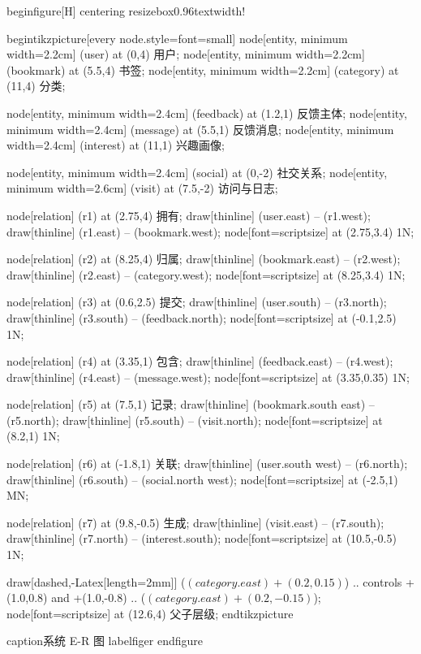 begin{figure}[H]
centering
resizebox{0.96textwidth}{!}{
begin{tikzpicture}[every node.style={font=small}]
  node[entity, minimum width=2.2cm] (user) at (0,4) {用户};
  node[entity, minimum width=2.2cm] (bookmark) at (5.5,4) {书签};
  node[entity, minimum width=2.2cm] (category) at (11,4) {分类};

  node[entity, minimum width=2.4cm] (feedback) at (1.2,1) {反馈主体};
  node[entity, minimum width=2.4cm] (message) at (5.5,1) {反馈消息};
  node[entity, minimum width=2.4cm] (interest) at (11,1) {兴趣画像};

  node[entity, minimum width=2.4cm] (social) at (0,-2) {社交关系};
  node[entity, minimum width=2.6cm] (visit) at (7.5,-2) {访问与日志};

  node[relation] (r1) at (2.75,4) {拥有};
  draw[thinline] (user.east) -- (r1.west);
  draw[thinline] (r1.east) -- (bookmark.west);
  node[font=scriptsize] at (2.75,3.4) {1N};

  node[relation] (r2) at (8.25,4) {归属};
  draw[thinline] (bookmark.east) -- (r2.west);
  draw[thinline] (r2.east) -- (category.west);
  node[font=scriptsize] at (8.25,3.4) {1N};

  node[relation] (r3) at (0.6,2.5) {提交};
  draw[thinline] (user.south) -- (r3.north);
  draw[thinline] (r3.south) -- (feedback.north);
  node[font=scriptsize] at (-0.1,2.5) {1N};

  node[relation] (r4) at (3.35,1) {包含};
  draw[thinline] (feedback.east) -- (r4.west);
  draw[thinline] (r4.east) -- (message.west);
  node[font=scriptsize] at (3.35,0.35) {1N};

  node[relation] (r5) at (7.5,1) {记录};
  draw[thinline] (bookmark.south east) -- (r5.north);
  draw[thinline] (r5.south) -- (visit.north);
  node[font=scriptsize] at (8.2,1) {1N};

  node[relation] (r6) at (-1.8,1) {关联};
  draw[thinline] (user.south west) -- (r6.north);
  draw[thinline] (r6.south) -- (social.north west);
  node[font=scriptsize] at (-2.5,1) {MN};

  node[relation] (r7) at (9.8,-0.5) {生成};
  draw[thinline] (visit.east) -- (r7.south);
  draw[thinline] (r7.north) -- (interest.south);
  node[font=scriptsize] at (10.5,-0.5) {1N};

  draw[dashed,-{Latex[length=2mm]}] ($(category.east)+(0.2,0.15)$)
    .. controls +(1.0,0.8) and +(1.0,-0.8) ..
    ($(category.east)+(0.2,-0.15)$);
  node[font=scriptsize] at (12.6,4) {父子层级};
end{tikzpicture}
}
caption{系统 E-R 图}
label{figer}
end{figure}


